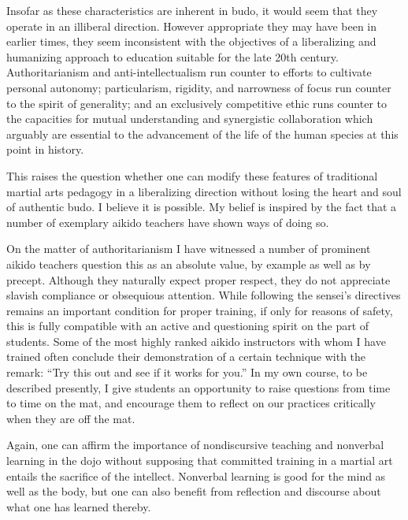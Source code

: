 Insofar as these characteristics are inherent in budo, it would seem that they operate in an illiberal direction. However appropriate they may have been in earlier times, they seem inconsistent with the objectives of a liberalizing and humanizing approach to education suitable for the late 20th century. Authoritarianism and anti-intellectualism run counter to efforts to cultivate personal autonomy; particularism, rigidity, and narrowness of focus run counter to the spirit of generality; and an exclusively competitive ethic runs counter to the capacities for mutual understanding and synergistic collaboration which arguably are essential to the advancement of the life of the human species at this point in history.

This raises the question whether one can modify these features of traditional martial arts pedagogy in a liberalizing direction without losing the heart and soul of authentic budo. I believe it is possible. My belief is inspired by the fact that a number of exemplary aikido teachers have shown ways of doing so.

On the matter of authoritarianism I have witnessed a number of prominent aikido teachers question this as an absolute value, by example as well as by precept. Although they naturally expect proper respect, they do not appreciate slavish compliance or obsequious attention. While following the sensei's directives remains an important condition for proper training, if only for reasons of safety, this is fully compatible with an active and questioning spirit on the part of students. Some of the most highly ranked aikido instructors with whom I have trained often conclude their demonstration of a certain technique with the remark: ``Try this out and see if it works for you.'' In my own course, to be described presently, I give students an opportunity to raise questions from time to time on the mat, and encourage them to reflect on our practices critically when they are off the mat.

Again, one can affirm the importance of nondiscursive teaching and nonverbal learning in the dojo without supposing that committed training in a martial art entails the sacrifice of the intellect. Nonverbal learning is good for the mind as well as the body, but one can also benefit from reflection and discourse about what one has learned thereby. 

